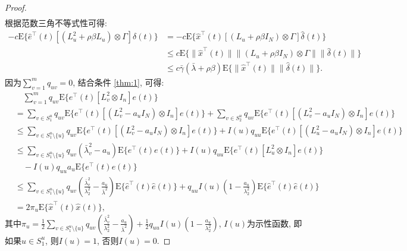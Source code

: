 \begin{proof}
\begin{align}
        \end{align}
        根据范数三角不等式性可得:
        \begin{align}\label{e15}
        -c\mathrm{E}\Big\{\hat{e}^{\top}(t)[(L^2_u+\rho\beta L_u)\otimes \Gamma]{\delta}(t)\Big\}
        \nonumber&=-c\mathrm{E}\Big\{\hat{x}^{\top}(t)[(L_u+\rho\beta I_N)\otimes \Gamma]\hat{{\delta}}(t)\Big\}\\
        \nonumber&\leq c\mathrm{E}\Big\{\|\hat{x}^{\top}(t)\|\|(L_u+\rho\beta I_N)\otimes \Gamma\|\|\hat{{\delta}}(t)\|\Big\}\\
        &\leq c\bar{\gamma}(\bar{\lambda}+\rho\beta)\mathrm{E}\Big\{\|\hat{x}^{\top}(t)\|\|\hat{{\delta}}(t)\|\Big\}.
        \end{align}
        因为$\sum_{v=1}^{m}q_{uv}=0$, 结合条件 \eqref{thm:1}, 可得:
        \begin{align}\label{em}
        \nonumber&\quad\sum_{v=1}^{m}q_{uv}\mathrm{E}\Big\{e^\top(t)[L^2_{v}\otimes I_n]e(t)\Big\}\\
        \nonumber&=\sum_{v\in S_1^u}q_{uv}\mathrm{E}\Big\{e^\top(t)[(L^2_{v}-a_uI_N)\otimes I_n]e(t)\Big\}
        +\sum_{v\in S_2^u}q_{uv}\mathrm{E}\Big\{e^\top(t)[(L^2_{v}-a_uI_N)\otimes I_n]e(t)\Big\}\\
        \nonumber&\leq\sum_{v\in S_1^u\setminus\{u\}}q_{uv}\mathrm{E}\Big\{e^\top(t)[(L^2_{v}-a_uI_N)\otimes I_n]e(t)\Big\}
        +I(u)q_{uu}\mathrm{E}\Big\{e^\top(t)[(L^2_{u}-a_uI_N)\otimes I_n]e(t)\Big\}\\
        \nonumber&\leq\sum_{v\in S_1^u\setminus\{u\}}q_{uv}(\bar{\lambda}^2_{v}-a_u)\mathrm{E}\Big\{e^\top(t)e(t)\Big\}
        +I(u)q_{uu}\mathrm{E}\Big\{e^\top(t)[L^2_{u}\otimes I_n]e(t)\Big\}\\
        \nonumber&\quad-I(u)q_{uu}a_u\mathrm{E}\Big\{e^\top(t)e(t)\Big\}\\
        \nonumber&\leq\sum_{v\in S_1^u\setminus\{u\}}q_{uv}(\frac{\bar{\lambda}^2_{v}}{\lambda_2^{2}}-\frac{a_u}{\bar{\lambda}^{2}})\mathrm{E}\Big\{\hat{e}^\top(t)\hat{e}(t)\Big\}
        +q_{uu}I(u)(1-\frac{a_u}{\lambda_2^2})\mathrm{E}\Big\{\hat{e}^\top(t)\hat{e}(t)\Big\}\\
        &=2\pi_u\mathrm{E}\Big\{\hat{x}^\top(t)\hat{x}(t)\Big\},
        \end{align}
        其中$\pi_u=\frac{1}{2}\sum_{v\in S_1^u\setminus\{u\}}q_{uv}(\frac{\bar{\lambda}^2_{v}}{\lambda_2^2}-\frac{a_u}{\bar{\lambda}^2})
        +\frac{1}{2}q_{uu}I(u)(1-\frac{a_u}{\lambda_2^2})$, $I(u)$为示性函数, 即如果$u\in S_1^u$, 则$I(u)=1$, 否则$I(u)=0$.


\end{proof}
